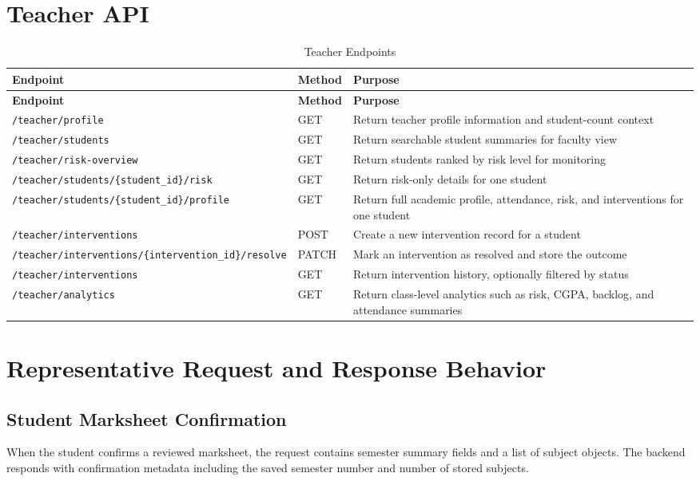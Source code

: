 \section{Teacher API}
\begin{longtable}{p{}p{}p{}}
\caption{Teacher Endpoints}\\
\toprule
\textbf{Endpoint} & \textbf{Method} & \textbf{Purpose} \\
\midrule
\endfirsthead
\toprule
\textbf{Endpoint} & \textbf{Method} & \textbf{Purpose} \\
\midrule
\endhead
\texttt{/teacher/profile} & GET & Return teacher profile information and student-count context \\
\texttt{/teacher/students} & GET & Return searchable student summaries for faculty view \\
\texttt{/teacher/risk-overview} & GET & Return students ranked by risk level for monitoring \\
\texttt{/teacher/students/\{student\_id\}/risk} & GET & Return risk-only details for one student \\
\texttt{/teacher/students/\{student\_id\}/profile} & GET & Return full academic profile, attendance, risk, and interventions for one student \\
\texttt{/teacher/interventions} & POST & Create a new intervention record for a student \\
\texttt{/teacher/interventions/\{intervention\_id\}/resolve} & PATCH & Mark an intervention as resolved and store the outcome \\
\texttt{/teacher/interventions} & GET & Return intervention history, optionally filtered by status \\
\texttt{/teacher/analytics} & GET & Return class-level analytics such as risk, CGPA, backlog, and attendance summaries \\
\bottomrule
\end{longtable}

\section{Representative Request and Response Behavior}
\subsection{Student Marksheet Confirmation}
When the student confirms a reviewed marksheet, the request contains semester summary fields and a list of subject objects. The backend responds with confirmation metadata including the saved semester number and number of stored subjects.

